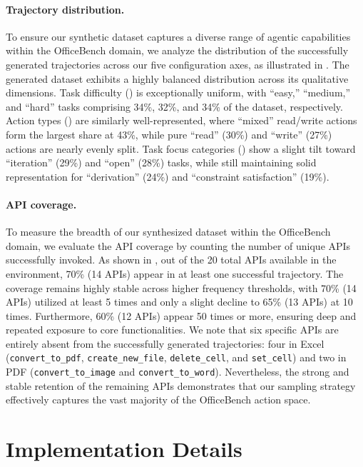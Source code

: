 \paragraph{Trajectory distribution.}
To ensure our synthetic dataset captures a diverse range of agentic capabilities within the OfficeBench domain, we analyze the distribution of the successfully generated trajectories across our five configuration axes, as illustrated in . The generated dataset exhibits a highly balanced distribution across its qualitative dimensions. Task difficulty () is exceptionally uniform, with ``easy,'' ``medium,'' and ``hard'' tasks comprising 34\%, 32\%, and 34\% of the dataset, respectively. Action types () are similarly well-represented, where ``mixed'' read/write actions form the largest share at 43\%, while pure ``read'' (30\%) and ``write'' (27\%) actions are nearly evenly split. Task focus categories () show a slight tilt toward ``iteration'' (29\%) and ``open'' (28\%) tasks, while still maintaining solid representation for ``derivation'' (24\%) and ``constraint satisfaction'' (19\%).

\paragraph{API coverage.}
To measure the breadth of our synthesized dataset within the OfficeBench domain, we evaluate the API coverage by counting the number of unique APIs successfully invoked. As shown in , out of the 20 total APIs available in the environment, 70\% (14 APIs) appear in at least one successful trajectory. The coverage remains highly stable across higher frequency thresholds, with 70\% (14 APIs) utilized at least 5 times and only a slight decline to 65\% (13 APIs) at 10 times. Furthermore, 60\% (12 APIs) appear 50 times or more, ensuring deep and repeated exposure to core functionalities. We note that six specific APIs are entirely absent from the successfully generated trajectories: four in Excel (\texttt{convert\_to\_pdf}, \texttt{create\_new\_file}, \texttt{delete\_cell}, and \texttt{set\_cell}) and two in PDF (\texttt{convert\_to\_image} and \texttt{convert\_to\_word}). Nevertheless, the strong and stable retention of the remaining APIs demonstrates that our sampling strategy effectively captures the vast majority of the OfficeBench action space.


\section{Implementation Details}
\label{sec:app-impl}


